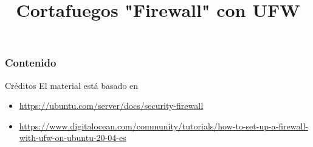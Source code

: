 \documentclass[aspectratio=169]{beamer}
\title{Cortafuegos "Firewall" con UFW}
\begin{document}
\begin{frame}
    \titlepage
\end{frame}

\begin{frame}
    \frametitle{Contenido}
    \tableofcontents
\end{frame}



\begin{frame}[c]{Créditos}
  El material está basado en
  \begin{itemize}
    \item \href{https://ubuntu.com/server/docs/security-firewall}{https://ubuntu.com/server/docs/security-firewall}
    \item \href{https://www.digitalocean.com/community/tutorials/how-to-set-up-a-firewall-with-ufw-on-ubuntu-20-04-es}{https://www.digitalocean.com/community/tutorials/how-to-set-up-a-firewall-with-ufw-on-ubuntu-20-04-es}
  \end{itemize}
\end{frame}
\end{document}
